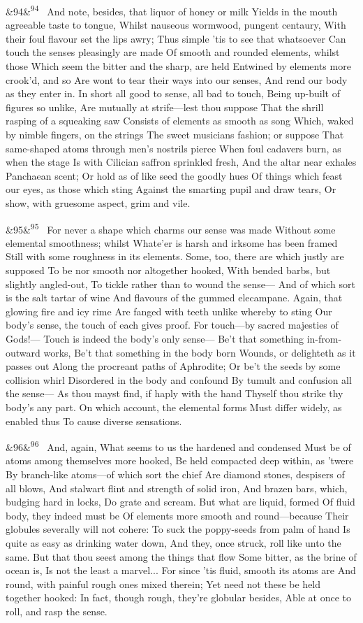 \documentclass[12pt]{article}
\newcommand{\para}[1][]{\par\noindent\ifx&#1&\else\textsuperscript{\footnotesize #1}~\fi}
\begin{document}
\para[94] And note, besides, that liquor of honey or milk Yields in the mouth agreeable taste to tongue, Whilst nauseous wormwood, pungent centaury, With their foul flavour set the lips awry; Thus simple 'tis to see that whatsoever Can touch the senses pleasingly are made Of smooth and rounded elements, whilst those Which seem the bitter and the sharp, are held Entwined by elements more crook'd, and so Are wont to tear their ways into our senses, And rend our body as they enter in. In short all good to sense, all bad to touch, Being up-built of figures so unlike, Are mutually at strife---lest thou suppose That the shrill rasping of a squeaking saw Consists of elements as smooth as song Which, waked by nimble fingers, on the strings The sweet musicians fashion; or suppose That same-shaped atoms through men's nostrils pierce When foul cadavers burn, as when the stage Is with Cilician saffron sprinkled fresh, And the altar near exhales Panchaean scent; Or hold as of like seed the goodly hues Of things which feast our eyes, as those which sting Against the smarting pupil and draw tears, Or show, with gruesome aspect, grim and vile.

\para[95] For never a shape which charms our sense was made Without some elemental smoothness; whilst Whate'er is harsh and irksome has been framed Still with some roughness in its elements. Some, too, there are which justly are supposed To be nor smooth nor altogether hooked, With bended barbs, but slightly angled-out, To tickle rather than to wound the sense--- And of which sort is the salt tartar of wine And flavours of the gummed elecampane. Again, that glowing fire and icy rime Are fanged with teeth unlike whereby to sting Our body's sense, the touch of each gives proof. For touch---by sacred majesties of Gods!--- Touch is indeed the body's only sense--- Be't that something in-from-outward works, Be't that something in the body born Wounds, or delighteth as it passes out Along the procreant paths of Aphrodite; Or be't the seeds by some collision whirl Disordered in the body and confound By tumult and confusion all the sense--- As thou mayst find, if haply with the hand Thyself thou strike thy body's any part. On which account, the elemental forms Must differ widely, as enabled thus To cause diverse sensations.

\para[96] And, again, What seems to us the hardened and condensed Must be of atoms among themselves more hooked, Be held compacted deep within, as 'twere By branch-like atoms---of which sort the chief Are diamond stones, despisers of all blows, And stalwart flint and strength of solid iron, And brazen bars, which, budging hard in locks, Do grate and scream. But what are liquid, formed Of fluid body, they indeed must be Of elements more smooth and round---because Their globules severally will not cohere: To suck the poppy-seeds from palm of hand Is quite as easy as drinking water down, And they, once struck, roll like unto the same. But that thou seest among the things that flow Some bitter, as the brine of ocean is, Is not the least a marvel... For since 'tis fluid, smooth its atoms are And round, with painful rough ones mixed therein; Yet need not these be held together hooked: In fact, though rough, they're globular besides, Able at once to roll, and rasp the sense.
\end{document}
